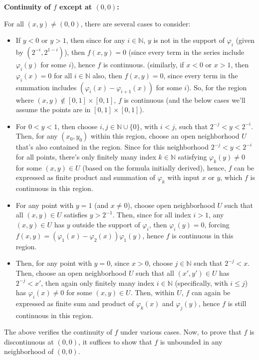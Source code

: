 \documentclass{article}
\begin{document}
\hfil

\textbf{Continuity of $f$ except at $(0,0)$:}

For all $(x,y)\neq (0,0)$, there are several cases to consider:
\begin{itemize}
    \item If $y<0$ or $y>1$, then since for any $i\in\mathbb{N}$, $y$ is not in the support of $\varphi_i$ (given by $(2^{-i},2^{1-i})$), then $f(x,y)=0$ (since every term in the series include $\varphi_i(y)$ for some $i$), hence $f$ is continuous. (similarly, if $x<0$ or $x>1$, then $\varphi_i(x)=0$ for all $i\in\mathbb{N}$ also, then $f(x,y)=0$, since every term in the summation includes $(\varphi_i(x)-\varphi_{i+1}(x))$ for some $i$). So, for the region where $(x,y)\notin [0,1]\times [0,1]$, $f$ is continuous (and the below cases we'll assume the points are in $[0,1]\times [0,1]$).
    \item For $0<y<1$, then choose $i,j\in\mathbb{N}\cup\{0\}$, with $i<j$, such that $2^{-j}<y<2^{-i}$. Then, for any $(x_0,y_0)$ within this region, choose an open neighborhood $U$ that's also contained in the region. Since for this neighborhood $2^{-j}<y<2^{-i}$ for all points, there's only finitely many index $k\in\mathbb{N}$ satisfying $\varphi_k(y)\neq 0$ for some $(x,y)\in U$ (based on the formula initially derived), hence, $f$ can be expressed as finite product and summation of $\varphi_k$ with input $x$ or $y$, which $f$ is continuous in this region.
    \item For any point with $y=1$ (and $x\neq 0$), choose open neighborhood $U$ such that all $(x,y)\in U$ satisfies $y>2^{-1}$. Then, since for all index $i>1$, any $(x,y)\in U$ has $y$ outside the support of $\varphi_i$, then $\varphi_i(y)=0$, forcing $f(x,y)=(\varphi_1(x)-\varphi_2(x))\varphi_1(y)$, hence $f$ is continuous in this region.
    \item Then, for any point with $y=0$, since $x>0$, choose $j\in\mathbb{N}$ such that $2^{-j}<x$. Then, choose an open neighborhood $U$ such that all $(x',y')\in U$ has $2^{-j}<x'$, then again only finitely many index $i\in\mathbb{N}$ (specifically, with $i\leq j$) has $\varphi_i(x)\neq 0$ for some $(x,y)\in U$. Then, within $U$, $f$ can again be expressed as finite sum and product of $\varphi_k(x)$ and $\varphi_j(y)$, hence $f$ is still continuous in this region.
\end{itemize}

The above verifies the continuity of $f$ under various cases. Now, to prove that $f$ is discontinuous at $(0,0)$, it suffices to show that $f$ is unbounded in any neighborhood of $(0,0)$. 
\end{document}
